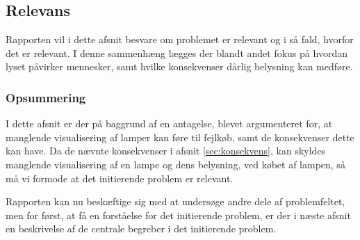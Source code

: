 \subsection{Relevans}
Rapporten vil i dette afsnit besvare om problemet er relevant og i så fald, hvorfor det er relevant. I denne sammenhæng lægges der blandt andet fokus på hvordan lyset påvirker mennesker, samt hvilke konsekvenser dårlig belysning kan medføre. 





\subsubsection*{Opsummering}
I dette afsnit er der på baggrund af en antagelse, blevet argumenteret for, at manglende visualisering af lamper kan føre til fejlkøb, samt de konsekvenser dette kan have. Da de nævnte konsekvenser i afsnit \ref{sec:konsekvens}, kan skyldes manglende visualisering af en lampe og dens belysning, ved købet af lampen, så må vi formode at det initierende problem er relevant.

Rapporten kan nu beskæftige sig med at undersøge andre dele af problemfeltet, men for først, at få en forståelse for det initierende problem, er der i næste afsnit en beskrivelse af de centrale begreber i det initierende problem.
